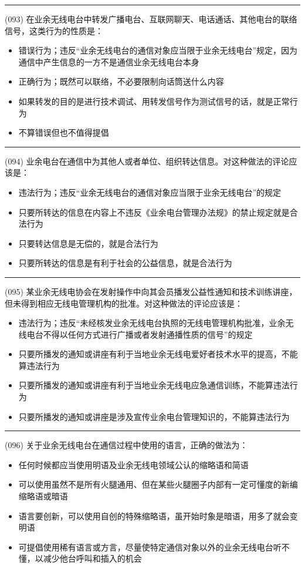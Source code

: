\documentclass[twocolumn]{ctexart}  %
\begin{document}
\noindent\rule{0.5\textwidth}{1pt}
\heiti (093) 在业余无线电台中转发广播电台、互联网聊天、电话通话、其他电台的联络信号，这类行为的性质是： \songti {\color{gray} [LK0057] }
\begin{itemize}
	\item  错误行为；违反“业余无线电台的通信对象应当限于业余无线电台”规定，因为通信中产生信息的一方不是通信业余无线电台本身
	\item  正确行为；既然可以联络，不必要限制向话筒送什么内容
	\item  如果转发的目的是进行技术调试、用转发信号作为测试信号的话，就是正常行为
	\item  不算错误但也不值得提倡
\end{itemize}


\noindent\rule{0.5\textwidth}{1pt}
\heiti (094) 业余电台在通信中为其他人或者单位、组织转达信息。对这种做法的评论应该是： \songti {\color{gray} [LK0058] }
\begin{itemize}
	\item  违法行为；违反“业余无线电台的通信对象应当限于业余无线电台”的规定
	\item  只要所转达的信息在内容上不违反《业余电台管理办法规》的禁止规定就是合法行为
	\item  只要转达信息是无偿的，就是合法行为
	\item  只要所转达的信息是有利于社会的公益信息，就是合法行为
\end{itemize}


\noindent\rule{0.5\textwidth}{1pt}
\heiti (095) 某业余无线电协会在发射操作中向其会员播发公益性通知和技术训练讲座，但未得到相应无线电管理机构的批准。对这种做法的评论应该是： \songti {\color{gray} [LK0059] }
\begin{itemize}
	\item  违法行为；违反“未经核发业余无线电台执照的无线电管理机构批准，业余无线电台不得以任何方式进行广播或者发射通播性质的信号”的规定
	\item  只要所播发的通知或讲座有利于当地业余无线电爱好者技术水平的提高，不能算违法行为
	\item  只要所播发的通知或讲座有利于当地业余无线电应急通信训练，不能算违法行为
	\item  只要所播发的通知或讲座是涉及宣传业余电台管理知识的，不能算违法行为
\end{itemize}


\noindent\rule{0.5\textwidth}{1pt}
\heiti (096) 关于业余无线电台在通信过程中使用的语言，正确的做法为： \songti {\color{gray} [LK0060] }
\begin{itemize}
	\item  任何时候都应当使用明语及业余无线电领域公认的缩略语和简语
	\item  可以使用虽然不是所有火腿通用、但在某些火腿圈子内部有一定可懂度的新编缩略语或暗语
	\item  语言要创新，可以使用自创的特殊缩略语，虽开始时象是暗语，用多了就会变明语
	\item  可提倡使用稀有语言或方言，尽量使特定通信对象以外的业余无线电台听不懂，以减少他台呼叫和插入的机会
\end{itemize}
\end{document}
